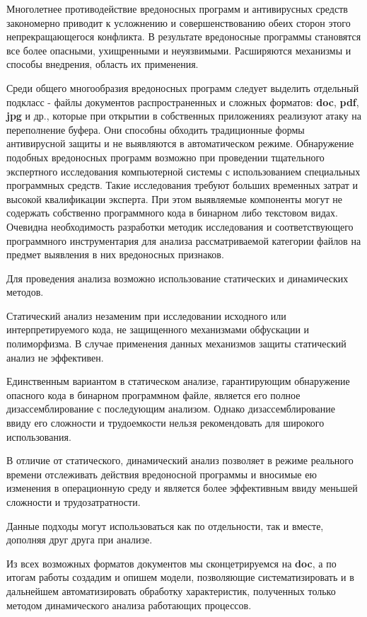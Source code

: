 
Многолетнее противодействие вредоносных программ и антивирусных средств закономерно приводит к усложнению и совершенствованию обеих сторон этого непрекращающегося конфликта. В результате вредоносные программы становятся все более опасными, ухищренными и неуязвимыми. Расширяются механизмы и способы внедрения, область их применения.

Среди общего многообразия вредоносных программ следует выделить отдельный подкласс -  файлы документов распространенных и сложных форматов: \textbf{doc}, \textbf{pdf}, \textbf{jpg} и др., которые при открытии в собственных приложениях реализуют атаку на переполнение буфера. Они способны обходить традиционные формы антивирусной защиты и не выявляются в автоматическом режиме. Обнаружение подобных вредоносных программ возможно при проведении тщательного экспертного исследования компьютерной системы с использованием специальных программных средств. Такие исследования требуют больших временных затрат и высокой квалификации эксперта. При этом выявляемые компоненты могут не содержать собственно программного кода в бинарном либо текстовом видах. Очевидна необходимость разработки методик исследования и соответствующего программного инструментария для анализа рассматриваемой категории файлов на предмет выявления в них вредоносных признаков.

Для проведения анализа возможно использование статических и динамических методов.

Статический анализ незаменим при исследовании исходного или интерпретируемого кода, не защищенного механизмами обфускации и полиморфизма. В случае применения данных механизмов защиты статический анализ не эффективен.

Единственным вариантом в статическом анализе, гарантирующим обнаружение опасного кода в бинарном программном файле, является его полное дизассемблирование с последующим анализом. Однако дизассемблирование ввиду его сложности и трудоемкости нельзя рекомендовать для широкого использования.

В отличие от статического, динамический анализ позволяет в режиме реального времени отслеживать действия вредоносной программы и вносимые ею изменения в операционную среду и является более эффективным ввиду меньшей сложности и трудозатратности.

Данные подходы могут использоваться как по отдельности, так и вместе, дополняя друг друга при анализе.

Из всех возможных форматов документов мы сконцетрируемся на \textbf{doc}, а по итогам работы создадим и опишем модели, позволяющие систематизировать и в дальнейшем автоматизировать обработку характеристик, полученных только методом динамического анализа работающих процессов.

